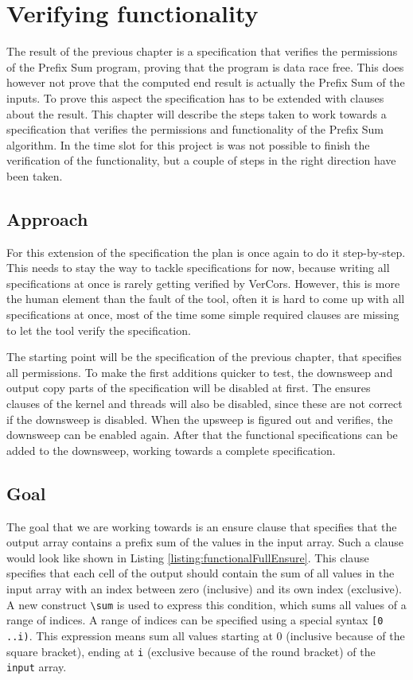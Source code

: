 \documentclass[a4paper]{article}
\newcommand{\code}[1]{\texttt{\small \color{inline}#1}} %
\begin{document}
\section{Verifying functionality}\label{chapter:verifyingFunctionality}
The result of the previous chapter is a specification that verifies the permissions of the Prefix Sum program, proving that the program is data race free. This does however not prove that the computed end result is actually the Prefix Sum of the inputs. To prove this aspect the specification has to be extended with clauses about the result. This chapter will describe the steps taken to work towards a specification that verifies the permissions and functionality of the Prefix Sum algorithm. In the time slot for this project is was not possible to finish the verification of the functionality, but a couple of steps in the right direction have been taken.

\subsection{Approach}
For this extension of the specification the plan is once again to do it step-by-step. This needs to stay the way to tackle specifications for now, because writing all specifications at once is rarely getting verified by VerCors. However, this is more the human element than the fault of the tool, often it is hard to come up with all specifications at once, most of the time some simple required clauses are missing to let the tool verify the specification.

The starting point will be the specification of the previous chapter, that specifies all permissions. To make the first additions quicker to test, the downsweep and output copy parts of the specification will be disabled at first. The ensures clauses of the kernel and threads will also be disabled, since these are not correct if the downsweep is disabled. When the upsweep is figured out and verifies, the downsweep can be enabled again. After that the functional specifications can be added to the downsweep, working towards a complete specification.

\subsection{Goal}
The goal that we are working towards is an ensure clause that specifies that the output array contains a prefix sum of the values in the input array. Such a clause would look like shown in Listing \ref{listing:functionalFullEnsure}. This clause specifies that each cell of the output should contain the sum of all values in the input array with an index between zero (inclusive) and its own index (exclusive). A new construct \code{\textbackslash sum} is used to express this condition, which sums all values of a range of indices. A range of indices can be specified using a special syntax \code{[0 ..i)}. This expression means sum all values starting at 0 (inclusive because of the square bracket), ending at \code{i} (exclusive because of the round bracket) of the \code{input} array.
\end{document}
